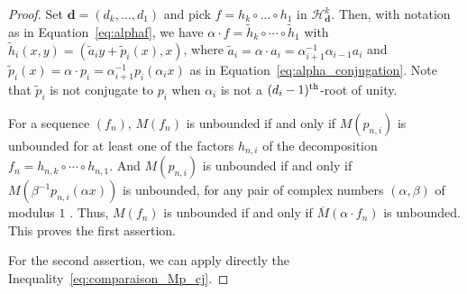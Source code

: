 \documentclass[oneside, 12pt]{amsart}
\newcommand{\inv}{^{-1}}
\theoremstyle{plain}
\theoremstyle{definition}
\numberwithin{equation}{section}       %
\numberwithin{equation}{section}       %
\begin{document}
\begin{proof} 
Set $\mathbf d = (d_k, \ldots, d_1)$ and pick $f=h_k\circ \ldots \circ h_1$ in $\mathcal H_{\mathbf d}^k$. 
Then, with notation as in Equation~\eqref{eq:alphaf}, we have  $\alpha\cdot f = \tilde h_k\circ \cdots\circ \tilde h_1$
with $\tilde h_i   (x,y) = (\tilde a_i y+\tilde p_i(x), x)$,  
where $\tilde a_i = \alpha\cdot a_i =\alpha_{i+1}\inv\alpha_{i-1} a_i$ and 
$\tilde p_i(x)   = \alpha\cdot p_i=\alpha_{i+1} \inv p_i(\alpha_ix)$ as in Equation~\eqref{eq:alpha_conjugation}. 
Note that $\tilde p_i$ is not conjugate to $p_i$ when 
 $\alpha_i$ is not a $(d_i-1)^{\rm th}$-root of unity. 
 

For a sequence $(f_n)$, $M(f_n)$ is unbounded if and only if $M(p_{n,i})$ is unbounded for at least one of the factors $h_{n,i}$ of the decomposition $f_n=h_{n,k}\circ \cdots \circ h_{n,1}$. 
And $M(p_{n,i})$ is unbounded if and only if 
$M(\beta\inv p_{n,i}(\alpha x))$ is unbounded, for any   pair of complex numbers $(\alpha, \beta)$ of modulus $1$ . Thus, $M(f_n)$ is unbounded if and only if $\overline M(\alpha\cdot f_n)$
is unbounded. This proves the first assertion. 
 
For the second assertion, we can apply directly the Inequality~\eqref{eq:comparaison_Mp_cj}. 
 

\end{proof}
\end{document}
